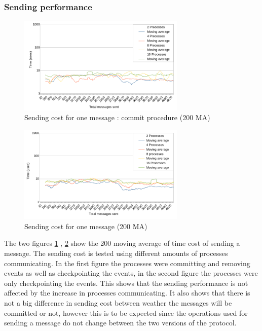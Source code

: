 \documentclass[twocolumn, a4paper,11pt]{article}%
\begin{document}
\subsubsection{Sending performance}
\begin{figure}[h]
	\includegraphics[width=8cm]{send_timing_commit_ma_new.png}
	\caption{Sending cost for one message : commit procedure (200 MA)}
	\label{fig:comm_send}
\end{figure}
\begin{figure}[h]
	\includegraphics[width=8cm]{send_timing_nocommit_ma_new.png}
	\caption{Sending cost for one message (200 MA)}
	\label{fig:nocomm_send}
\end{figure}\noindent
The two figures \ref{fig:comm_send} , \ref{fig:nocomm_send} show the 200 moving average of time cost of sending a message. The sending cost is tested using different amounts of processes communicating. In the first figure the processes were committing and removing events as well as checkpointing the events, in the second figure the processes were only checkpointing the events. This shows that the sending performance is not affected by the increase in processes communicating. It also shows that there is not a big difference in sending cost between weather the messages will be committed or not, however this is to be expected since the operations used for sending a message do not change between the two versions of the protocol.
\end{document}
